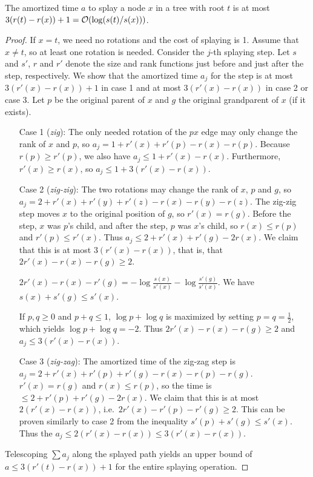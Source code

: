 \begin{lemma}
The amortized time $a$ to splay a node $x$ in a tree with root $t$
is at most $3(r(t)-r(x))+1 = \mathcal{O}(\log(s(t)/s(x)))$.
\end{lemma}
\begin{proof}
If $x=t$, we need no rotations and the cost of splaying is 1.
Assume that  $x\neq t$, so at least one rotation is needed.
Consider the $j$-th splaying step.
Let $s$ and $s'$, $r$ and $r'$ denote the size and rank functions just before
and just after the step, respectively. We show that the amortized time
$a_j$ for the step is at most $3(r'(x)-r(x))+1$ in case 1
and at most $3(r'(x)-r(x))$ in case 2 or case 3. Let $p$ be the original parent
of $x$ and $g$ the original grandparent of $x$ (if it exists).

\begin{itemize}
\item[Case 1 (\emph{zig}):]
	The only needed rotation of the $px$ edge may only change the rank of
	$x$ and $p$, so $a_j=1+r'(x)+r'(p)-r(x)-r(p)$.
	Because $r(p)\geq r'(p)$, we also have $a_j\leq 1+r'(x)-r(x)$.
	Furthermore, $r'(x)\geq r(x)$, so $a_j\leq 1+3(r'(x)-r(x))$.

\item[Case 2 (\emph{zig-zig}):]
	The two rotations may change the rank of $x$, $p$ and $g$,
	so $a_j=2+r'(x)+r'(y)+r'(z)-r(x)-r(y)-r(z)$. The zig-zig step
	moves $x$ to the original position of $g$, so $r'(x)=r(g)$.
	Before the step, $x$ was $p$'s child, and after the step,
	$p$ was $x$'s child, so $r(x)\leq r(p)$ and $r'(p)\leq r'(x)$.
	Thus $a_j\leq 2+r'(x)+r'(g)-2r(x)$.
	We claim that this is at most $3(r'(x)-r(x))$, that is, that
	$2r'(x)-r(x)-r(g)\geq 2$.

	$2r'(x)-r(x)-r'(g)=-\log\frac{s(x)}{s'(x)}-\log\frac{s'(g)}{s'(x)}$.
	We have $s(x)+s'(g)\leq s'(x)$.

	If $p,q\geq 0$ and $p+q\leq 1$, $\log p+\log q$ is maximized
	by setting $p=q=\frac{1}{2}$, which yields $\log p+\log q=-2$.
	Thus $2r'(x)-r(x)-r(g)\geq 2$ and $a_j \leq 3(r'(x)-r(x))$.

\item[Case 3 (\emph{zig-zag}):]
	The amortized time of the zig-zag step is
	$a_j=2+r'(x)+r'(p)+r'(g)-r(x)-r(p)-r(g)$. $r'(x)=r(g)$ and $r(x)\leq r(p)$,
	so the time is $\leq 2+r'(p)+r'(g)-2r(x)$.
	We claim that this is at most $2(r'(x)-r(x))$,
	i.e.\ $2r'(x)-r'(p)-r'(g)\geq 2$. This can be proven
	similarly to case 2 from the inequality $s'(p)+s'(g)\leq s'(x)$.
	Thus the $a_j \leq 2(r'(x)-r(x))\leq 3(r'(x)-r(x))$.
\end{itemize}

Telescoping $\sum a_j$ along the splayed path yields an upper bound of
$a \leq 3(r'(t)-r(x))+1$ for the entire splaying operation.
\end{proof}

